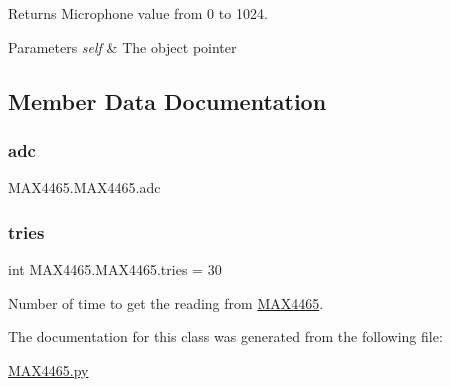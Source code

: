 Returns Microphone value from 0 to 1024. 


\begin{DoxyParams}{Parameters}
{\em self} & The object pointer \\
\hline
\end{DoxyParams}


\subsection{Member Data Documentation}
\mbox{\label{class_m_a_x4465_1_1_m_a_x4465_a3105c3a48d58a789f43392b02dcca53a}} 
\subsubsection{\texorpdfstring{adc}{adc}}
{\footnotesize\ttfamily M\+A\+X4465.\+M\+A\+X4465.\+adc}

\mbox{\label{class_m_a_x4465_1_1_m_a_x4465_a20f477b4c08ab04441833485453d3fc9}} 
\subsubsection{\texorpdfstring{tries}{tries}}
{\footnotesize\ttfamily int M\+A\+X4465.\+M\+A\+X4465.\+tries = 30\hspace{0.3cm}{\ttfamily [static]}}



Number of time to get the reading from \mbox{\hyperlink{class_m_a_x4465_1_1_m_a_x4465}{M\+A\+X4465}}. 



The documentation for this class was generated from the following file\+:\begin{DoxyCompactItemize}
\item 
\mbox{\hyperlink{_m_a_x4465_8py}{M\+A\+X4465.\+py}}\end{DoxyCompactItemize}
